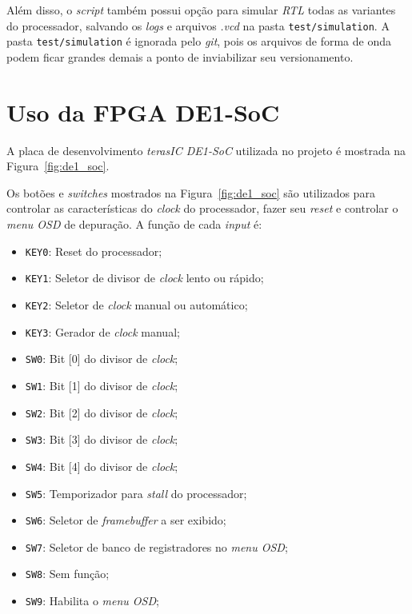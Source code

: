     { Além disso, o \textit{script} também possui opção para simular \textit{RTL}
        todas as variantes do processador, salvando os \textit{logs} e arquivos
        \textit{.vcd} na pasta \texttt{test/simulation}. A pasta \texttt{test/simulation}
        é ignorada pelo \textit{git}, pois os arquivos de forma de onda podem
        ficar grandes demais a ponto de inviabilizar seu versionamento.
    }

    \section{Uso da FPGA DE1-SoC}
    { A placa de desenvolvimento \textit{terasIC DE1-SoC} utilizada no projeto
        é mostrada na Figura~\ref{fig:de1_soc}.
    }

    { Os botões e \textit{switches} mostrados na Figura~\ref{fig:de1_soc} são
        utilizados para controlar as características do \textit{clock} do
        processador, fazer seu \textit{reset} e controlar o \textit{menu OSD}
        de depuração. A função de cada \textit{input} é:
    }
    \begin{itemize}
        \setlength\itemsep{0em}
        \item \texttt{KEY0}: Reset do processador;
        \item \texttt{KEY1}: Seletor de divisor de \textit{clock} lento ou rápido;
        \item \texttt{KEY2}: Seletor de \textit{clock} manual ou automático;
        \item \texttt{KEY3}: Gerador de \textit{clock} manual;
        \item \texttt{SW0}: Bit [0] do divisor de \textit{clock};
        \item \texttt{SW1}: Bit [1] do divisor de \textit{clock};
        \item \texttt{SW2}: Bit [2] do divisor de \textit{clock};
        \item \texttt{SW3}: Bit [3] do divisor de \textit{clock};
        \item \texttt{SW4}: Bit [4] do divisor de \textit{clock};
        \item \texttt{SW5}: Temporizador para \textit{stall} do processador;
        \item \texttt{SW6}: Seletor de \textit{framebuffer} a ser exibido;
        \item \texttt{SW7}: Seletor de banco de registradores no \textit{menu OSD};
        \item \texttt{SW8}: Sem função;
        \item \texttt{SW9}: Habilita o \textit{menu OSD};
    \end{itemize}

